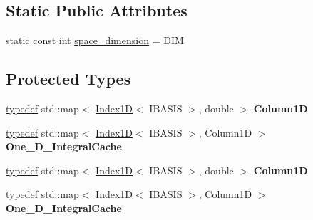 \subsection*{Static Public Attributes}
\begin{CompactItemize}
\item 
static const int \hyperlink{classFrameTL_1_1SimpleEllipticEquation_b3b9b916f42e8cf03bda2a6230141e79}{space\_\-dimension} = DIM
\end{CompactItemize}
\subsection*{Protected Types}
\begin{CompactItemize}
\item 
\hypertarget{classFrameTL_1_1SimpleEllipticEquation_c80a42f3986988eb09024ba27b6c175a}{
\hyperlink{structtypedef}{typedef} std::map$<$ \hyperlink{classFrameTL_1_1Index1D}{Index1D}$<$ IBASIS $>$, double $>$ \textbf{Column1D}}
\label{classFrameTL_1_1SimpleEllipticEquation_c80a42f3986988eb09024ba27b6c175a}

\item 
\hypertarget{classFrameTL_1_1SimpleEllipticEquation_9862b593a2b920a535d288fffeffb6b0}{
\hyperlink{structtypedef}{typedef} std::map$<$ \hyperlink{classFrameTL_1_1Index1D}{Index1D}$<$ IBASIS $>$, Column1D $>$ \textbf{One\_\-D\_\-IntegralCache}}
\label{classFrameTL_1_1SimpleEllipticEquation_9862b593a2b920a535d288fffeffb6b0}

\item 
\hypertarget{classFrameTL_1_1SimpleEllipticEquation_c80a42f3986988eb09024ba27b6c175a}{
\hyperlink{structtypedef}{typedef} std::map$<$ \hyperlink{classFrameTL_1_1Index1D}{Index1D}$<$ IBASIS $>$, double $>$ \textbf{Column1D}}
\label{classFrameTL_1_1SimpleEllipticEquation_c80a42f3986988eb09024ba27b6c175a}

\item 
\hypertarget{classFrameTL_1_1SimpleEllipticEquation_9862b593a2b920a535d288fffeffb6b0}{
\hyperlink{structtypedef}{typedef} std::map$<$ \hyperlink{classFrameTL_1_1Index1D}{Index1D}$<$ IBASIS $>$, Column1D $>$ \textbf{One\_\-D\_\-IntegralCache}}
\label{classFrameTL_1_1SimpleEllipticEquation_9862b593a2b920a535d288fffeffb6b0}

\end{CompactItemize}
